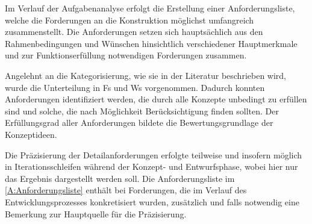 


Im Verlauf der Aufgabenanalyse erfolgt die Erstellung einer Anforderungsliste, welche die Forderungen an die Konstruktion möglichst umfangreich zusammenstellt. Die Anforderungen setzen sich hauptsächlich aus den Rahmenbedingungen und Wünschen hinsichtlich verschiedener Hauptmerkmale und zur Funktionserfüllung notwendigen Forderungen zusammen.
\par
\vspace{\linespace}
Angelehnt an die Kategorisierung, wie sie in der Literatur beschrieben wird, wurde die Unterteilung in \acp{F} und \acp{W} vorgenommen. Dadurch konnten Anforderungen identifiziert werden, die durch alle Konzepte unbedingt zu erfüllen sind und solche, die nach Möglichkeit Berücksichtigung finden sollten. Der Erfüllungsgrad aller Anforderungen bildete die Bewertungsgrundlage der Konzeptideen.
\par
\vspace{\linespace}
Die Präzisierung der Detailanforderungen erfolgte teilweise und insofern möglich in Iterationsschleifen während der Konzept- und Entwurfsphase, wobei hier nur das Ergebnis dargestellt werden soll. Die Anforderungsliste im \Anhang\ref{A:Anforderungsliste} enthält bei Forderungen, die im Verlauf des Entwicklungsprozesses konkretisiert wurden, zusätzlich und falls notwendig eine Bemerkung zur Hauptquelle für die Präzisierung.





